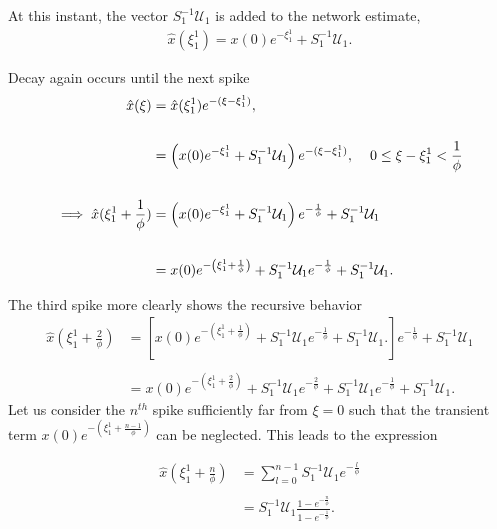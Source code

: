 \begin{enumerate}
 At this instant, the  vector $S^{-1}_1 \mathcal{U}_1$ is added to the network estimate,
 \begin{align*}
 \hat{x}( \xi_1^1) =  x(0) e^{-\xi_1^1 } + S^{-1}_1\mathcal{U}_1.
 \end{align*}
 
Decay again occurs until the next spike
\begin{align*}
\hat{
	x
}
(
	\xi
)
&= \hat
{
	x
}
(
	\xi_{1}^1
)
e^
{
	-
	(
		\xi - \xi_{1}^1
	)
},
%
\\
\\
%
&=
\left(
	 x(0) e^
	 {
	 	-\xi_1^1
	 }
	 +
	 S^{-1}_1 \mathcal{U}_1
\right)
e^
{
	-
	(
		\xi - 
		\xi_1^1
	)
} , \hspace{4mm} 
0 \leq \xi - \xi_1^1 <
\frac
{
	1
}
{
	\phi
}
%
\\
\\
%
\implies
\hat
{
	x
}
(
	\xi_1^1 + 
	\frac
	{
		1
	}
	{
		\phi
	}
)
&=
\left(
	x
	(
		0
	)
	e^
	{
		- \xi_1^1
	}
	 +
	 S^{-1}_1 \mathcal{U}_1 
\right)
e^
{
	-
	\frac
	{
		1
	}
	{
		\phi
	}
}
+
S^{-1}_1 \mathcal{U}_1
\\
\\
&=
x
(
	0
)
e^
{	
	-\left(
		\xi_1^1 + 
		\frac
		{
			1
		}
		{
			\phi
		}
	\right)
}
+
S^{-1}_1 \mathcal{U}_1
e^
{
	-\frac
	{
		1
	}
	{
		\phi
	}
} 
+
 S^{-1}_1 \mathcal{U}_1.
\end{align*}

The third spike more clearly shows the recursive behavior
\begin{align*}
\hat
{
	x
}
(
	\xi_1^1 + 
	\frac
	{
		2
	}
	{
		\phi
	}
)
&= 
\left[
	x
	(
		0
	)
	e^
	{	
		-\left(
			\xi_1^1 + 
			\frac
			{
				1
			}
			{
				\phi
			}
		\right)
	}
	+
	S^{-1}_1 \mathcal{U}_1
	e^
	{
		-\frac
		{
			1
		}
		{
			\phi
		}
	} 
	+
	S^{-1}_1 \mathcal{U}_1.
\right]
e^
{
	-\frac
	{
		1
	}
	{
			\phi
	}
}
+
S^{-1}_1 \mathcal{U}_1 
%
\\
\\
%
&= 
x
(
	0
)
e^
{	
	-\left(
		\xi_1^1 + 
		\frac
		{
			2
		}
		{
			\phi
		}
	\right)
}
+
S^{-1}_1 \mathcal{U}_1
e^
{
	-\frac
	{
		2
	}
	{
		\phi
	}
} 
+
S^{-1}_1 \mathcal{U}_1
e^
{
	-\frac
	{
		1
	}
	{
			\phi
	}
}
+
S^{-1}_1 \mathcal{U}_1.
\end{align*}
Let us consider the $n^{th}$ spike sufficiently far from $\xi=0$ such that the transient term $
x
(
	0
)
e^
{
	-\left(
		\xi_1^1	+ 
		\frac
		{
			n-1
		}
		{
			\phi
		}
	\right)
}
$ can be neglected. This leads to the expression

\begin{align*}
\hat
{
	x
}
\left(
	\xi_1^1 + 
	\frac
	{
		n
	}
	{
		\phi
	}
\right)
&=
\sum_
{
	l=0
}
^
{
n-1
}
S^{-1}_1 \mathcal{U}_1
e^
{
	- \frac
	{
		l
	}
	{
		\phi
	}
}
%
\\
\\
%
&=
S^{-1}_1 \mathcal{U}_1
\frac
{
	1 - e^
	{
		-\frac
		{
			n
		}
		{
			\phi
		}
	}  
}
{
	1 - e^
	{
		-\frac
		{
			1
		}
		{
			\phi
		}
	}  
}.
\end{align*}


\end{enumerate}
